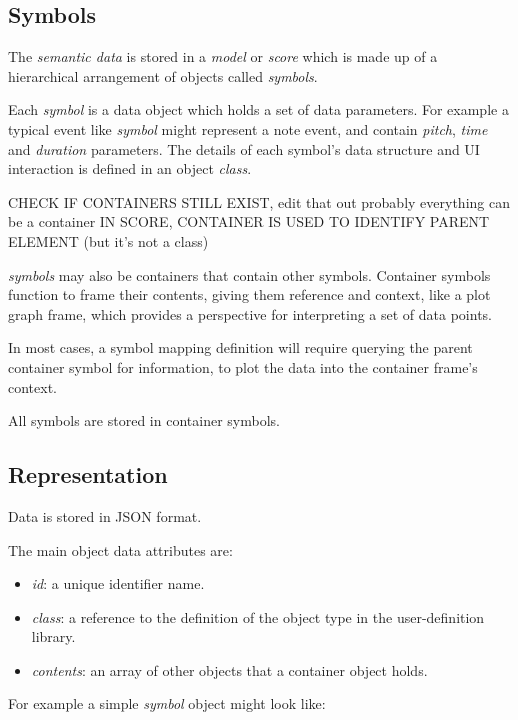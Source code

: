\documentclass{article}
\begin{document}
\subsection{Symbols}\label{subsec:symbols}

The \textit{semantic data} is stored in a \textit{model} or \textit{score} which is made up of a hierarchical arrangement of objects called \textit{symbols}.

Each \textit{symbol} is a data object which holds a set of data parameters. For example a typical event like \textit{symbol} might represent a note event, and contain \textit{pitch},  \textit{time} and \textit{duration} parameters. The details of each symbol's data structure and UI interaction is defined in an object \textit{class}.

CHECK IF CONTAINERS STILL EXIST, edit that out probably
everything can be a container
IN SCORE, CONTAINER IS USED TO IDENTIFY PARENT ELEMENT (but it's not a class)


\textit{symbols} may also be containers that contain other symbols. Container symbols function to frame their contents, giving them reference and context, like a plot graph frame, which provides a perspective for interpreting a set of data points.

In most cases, a symbol mapping definition will require querying the parent container symbol for information, to plot the data into the container frame's context. 

All symbols are stored in container symbols.
\subsection{Representation}\label{subsec:representation}

Data is stored in JSON format.

The main object data attributes are:
\begin{itemize}\itemsep0pt %
\item \textit{id}: a unique identifier name.
\item \textit{class}: a reference to the definition of the object type in the user-definition library.
\item \textit{contents}: an array of other objects that a container object holds.
\end{itemize}

For example a simple \textit{symbol} object might look like:
\end{document}
